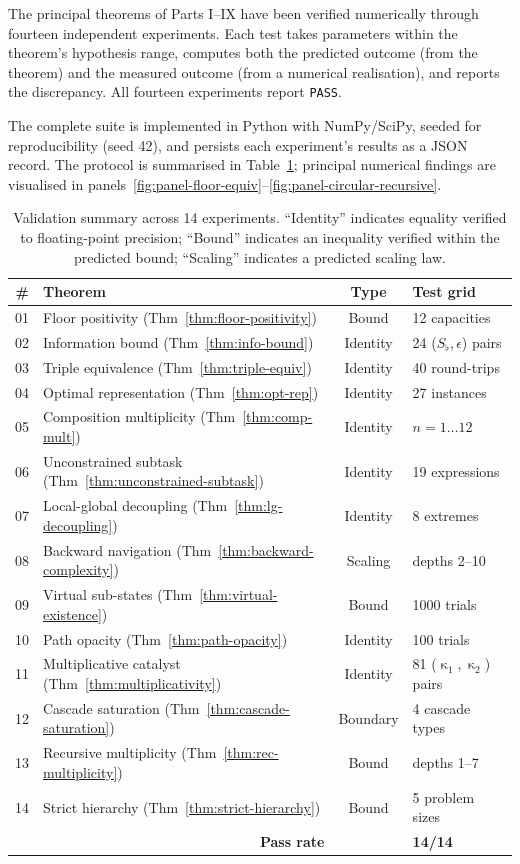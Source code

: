 \documentclass[twocolumn,a4paper]{article}
\DeclareMathOperator{\catpow}{\kappa}
\newcommand{\Sfloor}{S_{\flat}}
\begin{document}
The principal theorems of Parts I--IX have been verified numerically through fourteen independent experiments. Each test takes parameters within the theorem's hypothesis range, computes both the predicted outcome (from the theorem) and the measured outcome (from a numerical realisation), and reports the discrepancy. All fourteen experiments report \texttt{PASS}.

The complete suite is implemented in Python with NumPy/SciPy, seeded for reproducibility (seed 42), and persists each experiment's results as a JSON record. The protocol is summarised in Table~\ref{tab:val-summary}; principal numerical findings are visualised in panels~\ref{fig:panel-floor-equiv}--\ref{fig:panel-circular-recursive}.

\begin{table}[!htbp]
\centering
\small
\caption{Validation summary across 14 experiments. ``Identity'' indicates equality verified to floating-point precision; ``Bound'' indicates an inequality verified within the predicted bound; ``Scaling'' indicates a predicted scaling law.}
\label{tab:val-summary}
\begin{tabular}{rlcl}
\toprule
\# & Theorem & Type & Test grid \\
\midrule
01 & Floor positivity (Thm~\ref{thm:floor-positivity}) & Bound & 12 capacities \\
02 & Information bound (Thm~\ref{thm:info-bound}) & Identity & 24 ($\Sfloor,\epsilon$) pairs \\
03 & Triple equivalence (Thm~\ref{thm:triple-equiv}) & Identity & 40 round-trips \\
04 & Optimal representation (Thm~\ref{thm:opt-rep}) & Identity & 27 instances \\
05 & Composition multiplicity (Thm~\ref{thm:comp-mult}) & Identity & $n=1\ldots 12$ \\
06 & Unconstrained subtask (Thm~\ref{thm:unconstrained-subtask}) & Identity & 19 expressions \\
07 & Local-global decoupling (Thm~\ref{thm:lg-decoupling}) & Identity & 8 extremes \\
08 & Backward navigation (Thm~\ref{thm:backward-complexity}) & Scaling & depths 2--10 \\
09 & Virtual sub-states (Thm~\ref{thm:virtual-existence}) & Bound & 1000 trials \\
10 & Path opacity (Thm~\ref{thm:path-opacity}) & Identity & 100 trials \\
11 & Multiplicative catalyst (Thm~\ref{thm:multiplicativity}) & Identity & 81 ($\catpow_{1},\catpow_{2}$) pairs \\
12 & Cascade saturation (Thm~\ref{thm:cascade-saturation}) & Boundary & 4 cascade types \\
13 & Recursive multiplicity (Thm~\ref{thm:rec-multiplicity}) & Bound & depths 1--7 \\
14 & Strict hierarchy (Thm~\ref{thm:strict-hierarchy}) & Bound & 5 problem sizes \\
\midrule
\multicolumn{2}{r}{\textbf{Pass rate}} & & \textbf{14/14} \\
\bottomrule
\end{tabular}
\end{table}
\end{document}
